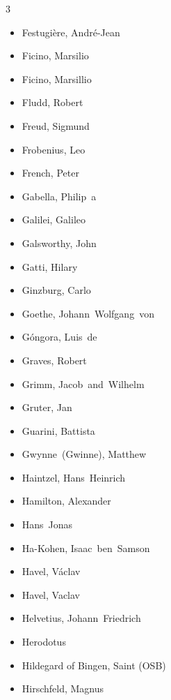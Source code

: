 \documentclass[10pt,makeidx]{extreport}
\begin{document}
\begin{multicols}{3}
\begin{itemize}
		\item Festugière, André-Jean
		\item Ficino, Marsilio
		\item Ficino, Marsillio
		\item Fludd, Robert
		\item Freud, Sigmund
		\item Frobenius, Leo
		\item French, Peter
		\item Gabella, Philip~a
		\item Galilei, Galileo
		\item Galsworthy, John
		\item Gatti, Hilary
		\item Ginzburg, Carlo
		\item Goethe, Johann~Wolfgang~von
		\item Góngora, Luis~de
		\item Graves, Robert
		\item Grimm, Jacob~and~Wilhelm
		\item Gruter, Jan
		\item Guarini, Battista
		\item Gwynne~(Gwinne), Matthew
		\item Haintzel, Hans~Heinrich
		\item Hamilton, Alexander
		\item Hans~Jonas
		\item Ha-Kohen, Isaac~ben~Samson
		\item Havel, Václav
		\item Havel, Vaclav
		\item Helvetius, Johann~Friedrich
		\item Herodotus
		\item Hildegard of Bingen, Saint (OSB)
		\item Hirschfeld, Magnus

\end{itemize}
\end{multicols}
\end{document}
